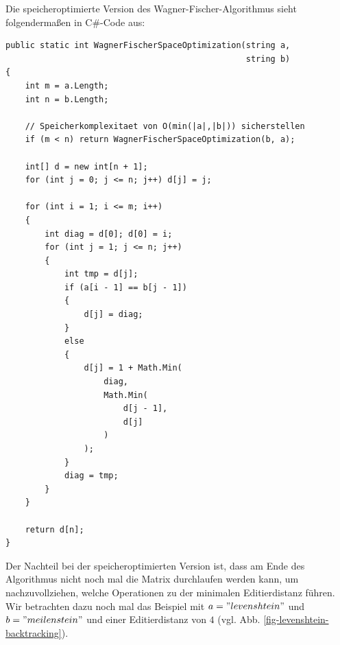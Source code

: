 \documentclass{whswinvcbook}
\begin{document}
Die speicheroptimierte Version des Wagner-Fischer-Algorithmus sieht folgendermaßen in C\#-Code aus:
\begin{lstlisting}[caption=Wagner-Fischer-Algorithmus mit Speicheroptimierung, label=lst:wagner_fischer_space]
public static int WagnerFischerSpaceOptimization(string a,
                                                 string b)
{
    int m = a.Length;
    int n = b.Length;

    // Speicherkomplexitaet von O(min(|a|,|b|)) sicherstellen
    if (m < n) return WagnerFischerSpaceOptimization(b, a);

    int[] d = new int[n + 1];
    for (int j = 0; j <= n; j++) d[j] = j;

    for (int i = 1; i <= m; i++)
    {
        int diag = d[0]; d[0] = i;
        for (int j = 1; j <= n; j++)
        {
            int tmp = d[j];
            if (a[i - 1] == b[j - 1])
            {
                d[j] = diag;
            }
            else
            {
                d[j] = 1 + Math.Min(
                    diag,
                    Math.Min(
                        d[j - 1],
                        d[j]
                    )
                );
            }
            diag = tmp;
        }
    }

    return d[n];
}
\end{lstlisting}
Der Nachteil bei der speicheroptimierten Version ist, dass am Ende des Algorithmus nicht noch mal die Matrix durchlaufen werden kann, um nachzuvollziehen, welche Operationen zu der minimalen Editierdistanz führen. Wir betrachten dazu noch mal das Beispiel mit $a="levenshtein"$ und $b="meilenstein"$ und einer Editierdistanz von $4$ (vgl. Abb. \ref{fig-levenshtein-backtracking}).
\end{document}
